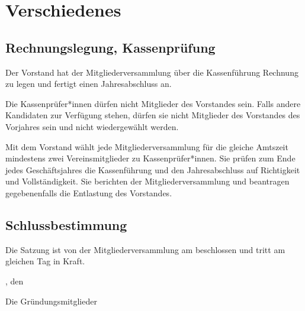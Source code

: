 \chapter{Verschiedenes}

\section{Rechnungslegung, Kassenprüfung}
\begin{absätze}
	\item Der Vorstand hat der Mitgliederversammlung über die Kassenführung Rechnung zu legen und fertigt einen Jahresabschluss an.
	\item Die Kassenprüfer*innen dürfen nicht Mitglieder des Vorstandes sein. Falls andere Kandidaten zur Verfügung stehen, dürfen sie nicht Mitglieder des Vorstandes des Vorjahres sein und nicht wiedergewählt werden.
	\item Mit dem Vorstand wählt jede Mitgliederversammlung für die gleiche Amtszeit mindestens zwei Vereinsmitglieder zu Kassenprüfer*innen. Sie prüfen zum Ende jedes Geschäftsjahres die Kassenführung und den Jahresabschluss auf Richtigkeit und Vollständigkeit. Sie berichten der Mitgliederversammlung und beantragen gegebenenfalls die Entlastung des Vorstandes.
\end{absätze}

\section{Schlussbestimmung}
Die Satzung ist von der Mitgliederversammlung am \DatumSatzung{} beschlossen und tritt am gleichen Tag in Kraft.

\vfill %

\Stadt{}, den \DatumSatzung{}

Die Gründungsmitglieder
